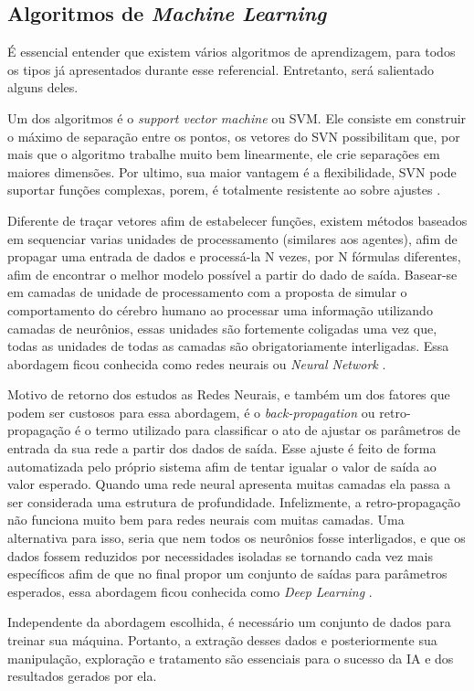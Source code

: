 \subsection{Algoritmos de \textit{Machine Learning}}
É essencial entender que existem vários algoritmos de aprendizagem, para todos os tipos já apresentados durante esse referencial. Entretanto, será salientado alguns deles.

Um dos algoritmos é o \textit{support vector machine} ou SVM. Ele consiste em construir o máximo de separação entre os pontos, os vetores do SVN possibilitam que, por mais que o algoritmo trabalhe muito bem linearmente, ele crie separações em maiores dimensões. Por ultimo, sua maior vantagem é a flexibilidade, SVN pode suportar funções complexas, porem, é totalmente resistente ao sobre ajustes \cite[744]{russell2003artificial}.

Diferente de traçar vetores afim de estabelecer funções, existem métodos baseados em sequenciar varias unidades de processamento (similares aos agentes), afim de propagar uma entrada de dados e processá-la N vezes, por N fórmulas diferentes, afim de encontrar o melhor modelo possível a partir do dado de saída. Basear-se em camadas de unidade de processamento com a proposta de simular o comportamento do cérebro humano ao processar uma informação utilizando camadas de neurônios, essas unidades são fortemente coligadas uma vez que, todas as unidades de todas as camadas são obrigatoriamente interligadas. Essa abordagem ficou conhecida como redes neurais ou \textit{Neural Network} \cite{haykin2004comprehensive, russell2003artificial}.

Motivo de retorno dos estudos as Redes Neurais, e também um dos fatores que podem ser custosos para essa abordagem, é o \textit{back-propagation} ou retro-propagação é o termo utilizado para classificar o ato de ajustar os parâmetros de entrada da sua rede a partir dos dados de saída. Esse ajuste é feito de forma automatizada pelo próprio sistema afim de tentar igualar o valor de saída ao valor esperado. Quando uma rede neural apresenta muitas camadas ela passa a ser considerada uma estrutura de profundidade. Infelizmente, a retro-propagação não funciona muito bem para redes neurais com muitas camadas. Uma alternativa para isso, seria que nem todos os neurônios fosse interligados, e que os dados fossem reduzidos por necessidades isoladas se tornando cada vez mais específicos afim de que no final propor um conjunto de saídas para parâmetros esperados, essa abordagem ficou conhecida como \textit{Deep Learning} \cite{lecun2015deep}.

Independente da abordagem escolhida, é necessário um conjunto de dados para treinar sua máquina. Portanto, a extração desses dados e posteriormente sua manipulação, exploração e tratamento são essenciais para o sucesso da IA e dos resultados gerados por ela.

